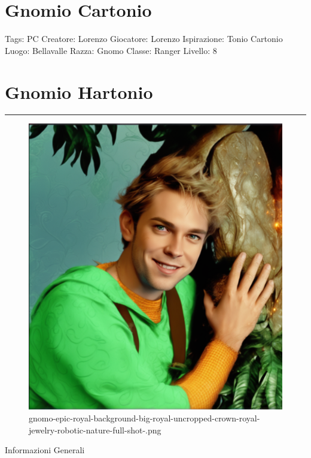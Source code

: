 \section{Gnomio Cartonio}\label{gnomio-cartonio}

Tags: PC Creatore: Lorenzo Giocatore: Lorenzo Ispirazione: Tonio
Cartonio Luogo: Bellavalle Razza: Gnomo Classe: Ranger Livello: 8

\section{Gnomio Hartonio}\label{gnomio-hartonio}

\begin{center}\rule{0.5\linewidth}{0.5pt}\end{center}

\begin{figure}
\centering
\includegraphics{gnomo-epic-royal-background-big-royal-uncropped-crown-royal-jewelry-robotic-nature-full-shot-.png}
\caption{gnomo-epic-royal-background-big-royal-uncropped-crown-royal-jewelry-robotic-nature-full-shot-.png}
\end{figure}

Informazioni Generali

